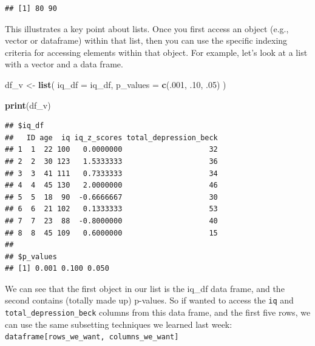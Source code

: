 \documentclass[
]{book}
\newenvironment{Shaded}{\begin{snugshade}}{\end{snugshade}}
\newcommand{\AttributeTok}[1]{\textcolor[rgb]{0.13,0.29,0.53}{#1}}
\newcommand{\DecValTok}[1]{\textcolor[rgb]{0.00,0.00,0.81}{#1}}
\newcommand{\FunctionTok}[1]{\textcolor[rgb]{0.13,0.29,0.53}{\textbf{#1}}}
\newcommand{\NormalTok}[1]{#1}
\newcommand{\OtherTok}[1]{\textcolor[rgb]{0.56,0.35,0.01}{#1}}
\newcommand{\SpecialCharTok}[1]{\textcolor[rgb]{0.81,0.36,0.00}{\textbf{#1}}}
\begin{document}
\begin{Shaded}
\end{Shaded}

\begin{verbatim}
## [1] 80 90
\end{verbatim}

This illustrates a key point about lists. Once you first access an object (e.g., vector or dataframe) within that list, then you can use the specific indexing criteria for accessing elements within that object. For example, let's look at a list with a vector and a data frame.

\begin{Shaded}
\begin{Highlighting}[]
\NormalTok{df\_v }\OtherTok{\textless{}{-}} \FunctionTok{list}\NormalTok{(}
  \AttributeTok{iq\_df =}\NormalTok{ iq\_df, }
  \AttributeTok{p\_values =} \FunctionTok{c}\NormalTok{(.}\DecValTok{001}\NormalTok{, .}\DecValTok{10}\NormalTok{, .}\DecValTok{05}\NormalTok{)}
\NormalTok{)}

\FunctionTok{print}\NormalTok{(df\_v)}
\end{Highlighting}
\end{Shaded}

\begin{verbatim}
## $iq_df
##   ID age  iq iq_z_scores total_depression_beck
## 1  1  22 100   0.0000000                    32
## 2  2  30 123   1.5333333                    36
## 3  3  41 111   0.7333333                    34
## 4  4  45 130   2.0000000                    46
## 5  5  18  90  -0.6666667                    30
## 6  6  21 102   0.1333333                    53
## 7  7  23  88  -0.8000000                    40
## 8  8  45 109   0.6000000                    15
## 
## $p_values
## [1] 0.001 0.100 0.050
\end{verbatim}

We can see that the first object in our list is the iq\_df data frame, and the second contains (totally made up) p-values. So if wanted to access the \texttt{iq} and \texttt{total\_depression\_beck} columns from this data frame, and the first five rows, we can use the same subsetting techniques we learned last week: \texttt{dataframe{[}rows\_we\_want,\ columns\_we\_want{]}}
\end{document}
